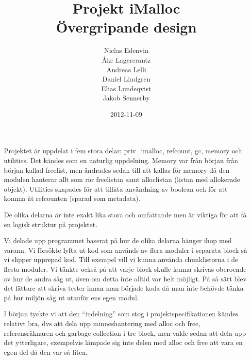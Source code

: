 \documentclass{article}
\title{
  Projekt iMalloc \\
  Övergripande design
}
\author{
  Niclas Edenvin \\
  Åke Lagercrantz \\
  Andreas Lelli \\
  Daniel Lindgren \\
  Elias Lundeqvist \\
  Jakob Sennerby
}
\date{2012-11-09}
\begin{document}
\maketitle

\newpage







Projektet är uppdelat i fem stora delar: priv\_imalloc, refcount, gc, memory och utilities. Det kändes som en naturlig uppdelning. Memory var från början från början kallad freelist, men ändrades sedan till att kallas för memory då den modulen hanterar allt som rör freelistan samt alloclistan (listan med allokerade objekt). Utilities skapades för att tillåta användning av boolean och för att komma åt refcounten (sparad som metadata).

De olika delarna är inte exakt lika stora och omfattande men är viktiga för att få en logisk struktur på projektet.

Vi delade upp programmet baserat på hur de olika delarna hänger ihop med varann. Vi försökte lyfta ut kod som används av flera moduler i separata block så vi slipper upprepad kod. Till exempel vill vi kunna använda chunklistorna i de flesta moduler. Vi tänkte också på att varje block skulle kunna skrivas oberoende av hur de andra såg ut, även om detta inte alltid var helt möjligt. På så sätt blev det lättare att skriva tester innan man började koda då man inte behövde tänka på hur miljön såg ut utanför ens egen modul.

I början tyckte vi att den “indelning” som stog i projektspecifikationen kändes relativt bra, dvs att dela upp minneshantering med alloc och free, referensräknaren och garbage collection i tre block, men valde sedan att dela upp det ytterligare, exempelvis lämpade sig inte delen med alloc och free att vara en egen del då den var så liten.
\end{document}
